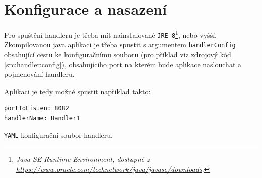 \section{Konfigurace a nasazení}\label{chap:handler:config}
Pro spuštění handleru je třeba mít nainstalované \texttt{JRE 8}\footnote{\textit{Java SE Runtime Environment, dostupné z\\\url{https://www.oracle.com/technetwork/java/javase/downloads}}.}, nebo vyšší.
Zkompilovanou java aplikaci je třeba spustit s argumentem \texttt{handlerConfig} obsahující cestu ke konfiguračnímu souboru (pro příklad viz zdrojový kód \ref{src:handler:config}), obsahujícího port na kterém bude aplikace naslouchat a pojmenování handleru.

Aplikaci je tedy možné spustit například takto: 

\begin{code}[h]
  \begin{verbatim}
portToListen: 8082
handlerName: Handler1
\end{verbatim}
\caption{\texttt{YAML} konfigurační soubor handleru.}
\label{src:handler:config}
\end{code}